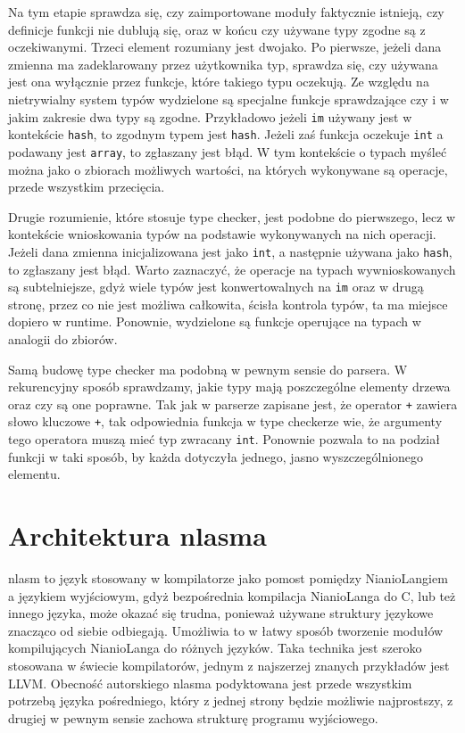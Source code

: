 \documentclass[licencjacka]{pracamgr}
\begin{document}
Na tym etapie sprawdza się, czy zaimportowane moduły faktycznie istnieją, czy definicje funkcji nie dublują się, oraz w końcu czy używane typy zgodne
są z oczekiwanymi. Trzeci element rozumiany jest dwojako. Po pierwsze, jeżeli dana zmienna ma zadeklarowany przez użytkownika typ, sprawdza się, czy
używana jest ona wyłącznie przez funkcje, które takiego typu oczekują.  Ze względu na nietrywialny system typów wydzielone są specjalne funkcje
sprawdzające czy i w jakim zakresie dwa typy są zgodne. Przykładowo jeżeli \texttt{im} używany jest w kontekście \texttt{hash}, to zgodnym typem jest
\texttt{hash}. Jeżeli zaś funkcja oczekuje \texttt{int} a podawany jest \texttt{array}, to zgłaszany jest błąd. W tym kontekście o typach myśleć można
jako o zbiorach możliwych wartości, na których wykonywane są operacje, przede wszystkim przecięcia.

Drugie rozumienie, które stosuje type checker, jest podobne do pierwszego, lecz w kontekście wnioskowania typów na podstawie wykonywanych na nich
operacji. Jeżeli dana zmienna inicjalizowana jest jako \texttt{int}, a następnie używana jako \texttt{hash}, to zgłaszany jest błąd. Warto zaznaczyć,
że operacje na typach wywnioskowanych są subtelniejsze, gdyż wiele typów jest konwertowalnych na \texttt{im} oraz w drugą stronę, przez co nie jest
możliwa całkowita, ścisła kontrola typów, ta ma miejsce dopiero w runtime. Ponownie, wydzielone są funkcje operujące na typach w analogii do zbiorów.

Samą budowę type checker ma podobną w pewnym sensie do parsera. W rekurencyjny sposób sprawdzamy, jakie typy mają poszczególne elementy drzewa oraz
czy są one poprawne. Tak jak w parserze zapisane jest, że operator \texttt{+} zawiera słowo kluczowe \texttt{+}, tak odpowiednia funkcja w type
checkerze wie, że argumenty tego operatora muszą mieć typ zwracany \texttt{int}. Ponownie pozwala to na podział funkcji w taki sposób, by każda
dotyczyła jednego, jasno wyszczególnionego elementu.
\section{Architektura nlasma}
nlasm to język stosowany w kompilatorze jako pomost pomiędzy NianioLangiem a językiem wyjściowym, gdyż bezpośrednia kompilacja NianioLanga do C, lub
też innego języka, może okazać się trudna, ponieważ używane struktury językowe znacząco od siebie odbiegają. Umożliwia to w łatwy sposób tworzenie
modułów kompilujących NianioLanga do różnych języków. Taka technika jest szeroko stosowana w świecie kompilatorów, jednym z najszerzej znanych
przykładów jest LLVM. Obecność autorskiego nlasma podyktowana jest przede wszystkim potrzebą języka pośredniego, który z jednej strony będzie możliwie
najprostszy, z drugiej w pewnym sensie zachowa strukturę programu wyjściowego.
\end{document}
